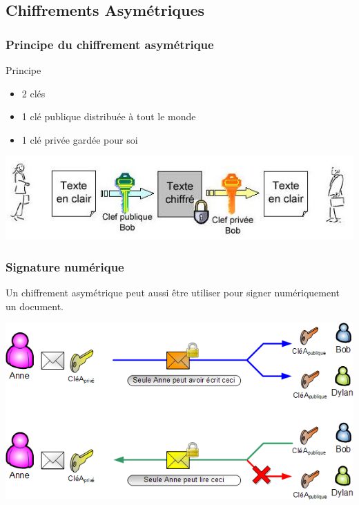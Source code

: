 \documentclass[xcolor={dvipsnames}]{beamer}
\begin{document}
\subsection{Chiffrements Asymétriques}

\begin{frame}
	\frametitle{Principe du chiffrement asymétrique}
	
	\begin{block}{Principe}
	
		\begin{itemize}
			\item 2 clés
			\item 1 clé publique distribuée à tout le monde
			\item 1 clé privée gardée pour soi
		\end{itemize}
	\end{block}
	
	\begin{center}
		\includegraphics[scale=0.6]{asym}
	\end{center}	
	
\end{frame}

\begin{frame}
\frametitle{Signature numérique}

Un chiffrement asymétrique peut aussi être utiliser pour signer numériquement un document.

\begin{center}
	\includegraphics[scale=0.5]{sign}
\end{center}
\end{frame}
\end{document}

